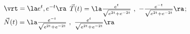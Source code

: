 {$\vrt = \la e^t,e^{-t} \ra$
}
{$\vec T(t) = \la \frac{e^t}{\sqrt{e^{2t}+e^{-2t}}}\ ,\ -\frac{e^{-t}}{\sqrt{e^{2t}+e^{-2t}}}\ra$; $\vec N(t) = \la \frac{e^{-t}}{\sqrt{e^{2t}+e^{-2t}}}\ ,\ \frac{e^{t}}{\sqrt{e^{2t}+e^{-2t}}}\ra$
}